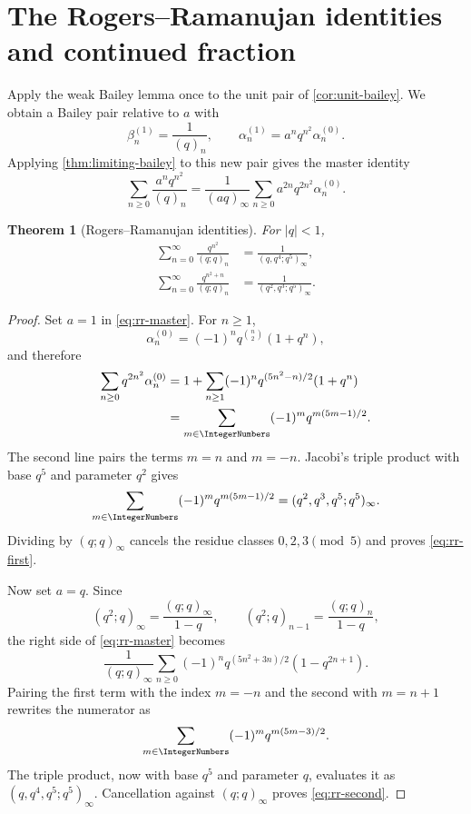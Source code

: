 \documentclass[11pt,oneside]{article}
\newtheorem{theorem}{Theorem}[section]
\theoremstyle{definition}
\begin{document}
\section{The Rogers--Ramanujan identities and continued fraction}
\label{sec:rogers-ramanujan}

Apply the weak Bailey lemma once to the unit pair of
\cref{cor:unit-bailey}.  We obtain a Bailey pair relative to $a$ with
\begin{equation}\label{eq:rr-bailey-pair}
 \beta_n^{(1)}=\frac1{(q)_n},
 \qquad
 \alpha_n^{(1)}=a^nq^{n^2}\alpha_n^{(0)}.
\end{equation}
Applying \cref{thm:limiting-bailey} to this new pair gives the master
identity
\begin{equation}\label{eq:rr-master}
 \sum_{n\ge0}\frac{a^nq^{n^2}}{(q)_n}
 =
 \frac1{(aq)_\infty}
 \sum_{n\ge0}a^{2n}q^{2n^2}\alpha_n^{(0)}.
\end{equation}

\begin{theorem}[Rogers--Ramanujan identities]\label{thm:rr}
For $|q|<1$,
\begin{align}
 \sum_{n=0}^{\infty}\frac{q^{n^2}}{(q;q)_n}
 &=
 \frac1{(q,q^4;q^5)_\infty},
 \label{eq:rr-first}\\
 \sum_{n=0}^{\infty}\frac{q^{n^2+n}}{(q;q)_n}
 &=
 \frac1{(q^2,q^3;q^5)_\infty}.
 \label{eq:rr-second}
\end{align}
\end{theorem}

\begin{proof}
Set $a=1$ in \eqref{eq:rr-master}.  For $n\ge1$,
\[
 \alpha_n^{(0)}
 =(-1)^nq^{\binom n2}(1+q^n),
\]
and therefore
\begin{align*}
 \sum_{n\ge0}q^{2n^2}\alpha_n^{(0)}
 &=1+\sum_{n\ge1}(-1)^n
 q^{(5n^2-n)/2}(1+q^n)\\
 &=\sum_{m\in\IntegerNumbers}(-1)^m q^{m(5m-1)/2}.
\end{align*}
The second line pairs the terms $m=n$ and $m=-n$.  Jacobi's triple
product with base $q^5$ and parameter $q^2$ gives
\[
 \sum_{m\in\IntegerNumbers}(-1)^m q^{m(5m-1)/2}
 =(q^2,q^3,q^5;q^5)_\infty.
\]
Dividing by $(q;q)_\infty$ cancels the residue classes
$0,2,3\pmod5$ and proves \eqref{eq:rr-first}.

Now set $a=q$.  Since
\[
 (q^2;q)_\infty=\frac{(q;q)_\infty}{1-q},
 \qquad
 (q^2;q)_{n-1}=\frac{(q;q)_n}{1-q},
\]
the right side of \eqref{eq:rr-master} becomes
\[
 \frac1{(q;q)_\infty}
 \sum_{n\ge0}(-1)^nq^{(5n^2+3n)/2}(1-q^{2n+1}).
\]
Pairing the first term with the index $m=-n$ and the second with
$m=n+1$ rewrites the numerator as
\[
 \sum_{m\in\IntegerNumbers}(-1)^m q^{m(5m-3)/2}.
\]
The triple product, now with base $q^5$ and parameter $q$, evaluates it
as $(q,q^4,q^5;q^5)_\infty$.  Cancellation against
$(q;q)_\infty$ proves \eqref{eq:rr-second}.
\end{proof}
\end{document}
